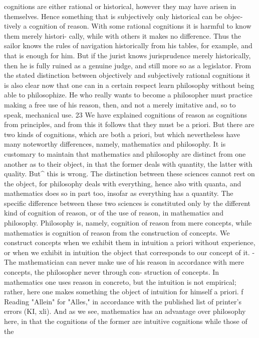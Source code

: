 cognitions are either rational or historical, however they may have arisen in
themselves. Hence something that is subjectively only historical can be objec-
tively a cognition of reason.
With some rational cognitions it is harmful to know them merely histori-
cally, while with others it makes no difference. Thus the sailor knows the
rules of navigation historically from his tables, for example, and that is
enough for him. But if the jurist knows jurisprudence merely historically,
then he is fully ruined as a genuine judge, and still more so as a legislator.
From the stated distinction between objectively and subjectively rational
cognitions it is also clear now that one can in a certain respect learn
philosophy without being able to philosophize. He who really wants to
become a philosopher must practice making a free use of his reason, then,
and not a merely imitative and, so to speak, mechanical use.
23
We have explained cognitions of reason as cognitions from principles, and
from this it follows that they must be a priori. But there are two kinds of
cognitions, which are both a priori, but which nevertheless have many
noteworthy differences, namely, mathematics and philosophy.
It is customary to maintain that mathematics and philosophy are distinct
from one another as to their object, in that the former deals with quantity,
the latter with quality. But^ this is wrong. The distinction between these
sciences cannot rest on the object, for philosophy deals with everything,
hence also with quanta, and mathematics does so in part too, insofar as
everything has a quantity. The specific difference between these two
sciences is constituted only by the different kind of cognition of reason, or of
the use of reason, in mathematics and philosophy. Philosophy is, namely,
cognition of reason from mere concepts, while mathematics is cognition of reason
from the construction of concepts.
We construct concepts when we exhibit them in intuition a priori without
experience, or when we exhibit in intuition the object that corresponds to
our concept of it. - The mathematician can never make use of his reason
in accordance with mere concepts, the philosopher never through con-
struction of concepts. In mathematics one uses reason in concreto, but the
intuition is not empirical; rather, here one makes something the object of
intuition for himself a priori.
f
Reading "Allein" for "Alles," in accordance with the published list of printer's errors
(KI, xli).
And as we see, mathematics has an advantage over philosophy here, in
that the cognitions of the former are intuitive cognitions while those of the
